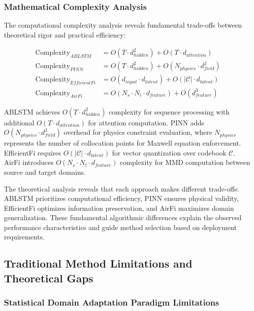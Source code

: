 \documentclass[journal]{IEEEtran}
\begin{document}
\subsubsection{Mathematical Complexity Analysis}

The computational complexity analysis reveals fundamental trade-offs between theoretical rigor and practical efficiency:

\begin{align}
\text{Complexity}_{ABLSTM} &= O(T \cdot d_{hidden}^2) + O(T \cdot d_{attention}) \label{eq:ablstm_complexity} \\
\text{Complexity}_{PINN} &= O(T \cdot d_{hidden}^2) + O(N_{physics} \cdot d_{field}^2) \label{eq:pinn_complexity} \\
\text{Complexity}_{EfficientFi} &= O(d_{input} \cdot d_{latent}) + O(|\mathcal{C}| \cdot d_{latent}) \label{eq:efficientfi_complexity} \\
\text{Complexity}_{AirFi} &= O(N_s \cdot N_t \cdot d_{feature}) + O(d_{feature}^3) \label{eq:airfi_complexity}
\end{align}

ABLSTM achieves $O(T \cdot d_{hidden}^2)$ complexity for sequence processing with additional $O(T \cdot d_{attention})$ for attention computation. PINN adds $O(N_{physics} \cdot d_{field}^2)$ overhead for physics constraint evaluation, where $N_{physics}$ represents the number of collocation points for Maxwell equation enforcement. EfficientFi requires $O(|\mathcal{C}| \cdot d_{latent})$ for vector quantization over codebook $\mathcal{C}$. AirFi introduces $O(N_s \cdot N_t \cdot d_{feature})$ complexity for MMD computation between source and target domains.

The theoretical analysis reveals that each approach makes different trade-offs: ABLSTM prioritizes computational efficiency, PINN ensures physical validity, EfficientFi optimizes information preservation, and AirFi maximizes domain generalization. These fundamental algorithmic differences explain the observed performance characteristics and guide method selection based on deployment requirements.

\subsection{Traditional Method Limitations and Theoretical Gaps}

\subsubsection{Statistical Domain Adaptation Paradigm Limitations}
\end{document}
